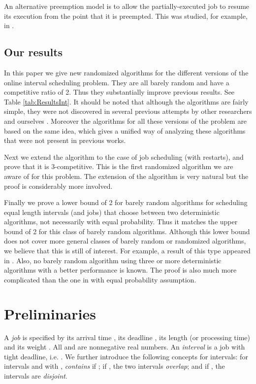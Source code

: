 \documentclass[11pt]{article}
\begin{document}
An alternative preemption model is to allow the partially-executed job to
resume its execution from the point that it is preempted.  This was
studied, for example, in \cite{BKMMR+92,KorSha95}.

\subsection{Our results}

In this paper we give new randomized algorithms for the different
versions of the online interval scheduling problem.
They are all barely random and have a competitive ratio of 2.
Thus they substantially improve previous results. 
See Table \ref{tab:ResultsInt}.
It should be noted that although the algorithms are fairly
simple, they were not discovered in 
several previous attempts by other researchers and ourselves
\cite{EpsLev10,FuPoZh07,MiyErl04}.
Moreover the algorithms for all these versions of the problem are based on 
the same idea, which gives a unified way of analyzing these algorithms 
that were not present in previous works.

Next we extend the algorithm to the case of job scheduling (with restarts),
and prove that it is 3-competitive.
This is the first randomized algorithm we are aware of for this problem.
The extension of the algorithm is very natural but the proof is
considerably more involved.

Finally we prove a lower bound of 2 for barely random algorithms for 
scheduling equal length intervals (and jobs)
that choose between two deterministic algorithms, not necessarily with
equal probability.  Thus it matches the upper bound of 2 for this
class of barely random algorithms.
Although this lower bound does not cover more general classes of
barely random or randomized algorithms, we believe that this is still
of interest.
For example, a result of this type appeared in \cite{CJST07}.
Also, no barely random algorithm using three or more deterministic
algorithms with a better performance is known.
The proof is also much more complicated than the
one in \cite{FuPoZh07} with equal probability assumption.

\section{Preliminaries}

A {\it job}  is specified by its arrival time , its deadline , 
its length (or processing time)  and its weight .  
All  and  are nonnegative real numbers.
An {\it interval} is a job with tight deadline, i.e. .
We further introduce the following concepts for intervals: for intervals 
and  with ,  \textit{contains}  if
; if , the two
intervals \textit{overlap}; and if , the intervals
are {\it disjoint}.
\end{document}
